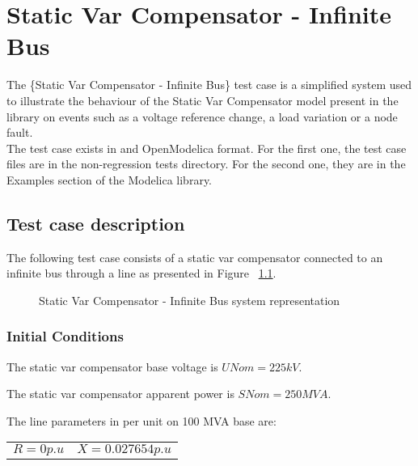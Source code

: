 \documentclass[a4paper, 12pt]{report}
\begin{document}
\chapter{Static Var Compensator - Infinite Bus}

The \{Static Var Compensator - Infinite Bus\} test case is a simplified system used to illustrate the behaviour of the Static Var Compensator model present in the \Dynawo library on events such as a voltage reference change, a load variation or a node fault.\\

The test case exists in \Dynawo and OpenModelica format. For the first one, the test case files are in the non-regression tests directory. For the second one, they are in the Examples section of the \Dynawo Modelica library.

\section{Test case description}

The following test case consists of a static var compensator connected to an infinite bus through a line as presented in Figure ~\ref{TestCase}.

\begin{figure}[H]
\centering
\def\factor{0.4}
\caption{Static Var Compensator - Infinite Bus system representation}
\label{TestCase}
\end{figure}

\subsection{Initial Conditions}

The static var compensator base voltage is $UNom = 225 kV$.

The static var compensator apparent power is $SNom = 250 MVA$.

The line parameters in per unit on 100 MVA base are:
\begin{center}
\begin{tabular}{l|l}
   $R = 0 p.u$ & $X = 0.027654 p.u$  \\
\end{tabular}
\end{center}
\end{document}
